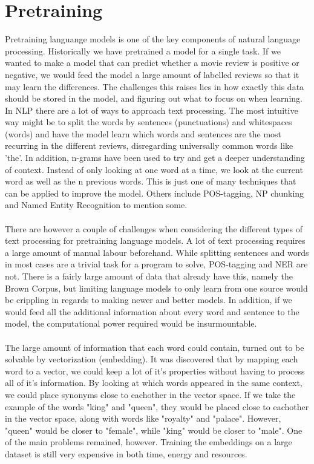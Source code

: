 \documentclass{report}
\begin{document}
\noindent

\section{Pretraining}
Pretraining languange models is one of the key components of natural language processing. Historically we have pretrained a model for a single task. If we wanted to make a model that can predict whether a movie review is positive or negative, we would feed the model a large amount of labelled reviews so that it may learn the differences. The challenges this raises lies in how exactly this data should be stored in the model, and figuring out what to focus on when learning. In NLP there are a lot of ways to approach text processing. The most intuitive way might be to split the words by sentences (punctuations) and whitespaces (words) and have the model learn which words and sentences are the most recurring in the different reviews, disregarding universally common words like 'the'. In addition, n-grams have been used to try and get a deeper understanding of context. Instead of only looking at one word at a time, we look at the current word as well as the n previous words. This is just one of many techniques that can be applied to improve the model. Others include POS-tagging, NP chunking and Named Entity Recognition to mention some.\\\\
\noindent
There are however a couple of challenges when considering the different types of text processing for pretraining language models. A lot of text processing requires a large amount of manual labour beforehand. While splitting sentences and words in most cases are a trivial task for a program to solve, POS-tagging and NER are not. There is a fairly large amount of data that already have this, namely the Brown Corpus, but limiting language models to only learn from one source would be crippling in regards to making newer and better models. In addition, if we would feed all the additional information about every word and sentence to the model, the computational power required would be insurmountable. 
\\\\
\noindent
The large amount of information that each word could contain, turned out to be solvable by vectorization (embedding). It was discovered that by mapping each word to a vector, we could keep a lot of it's properties without having to process all of it's information. By looking at which words appeared in the same context, we could place synonyms close to eachother in the vector space. If we take the example of the words "king" and "queen", they would be placed close to eachother in the vector space, along with words like "royalty" and "palace". However, "queen" would be closer to "female", while "king" would be closer to "male". One of the main problems remained, however. Training the embeddings on a large dataset is still very expensive in both time, energy and resources.
\end{document}
